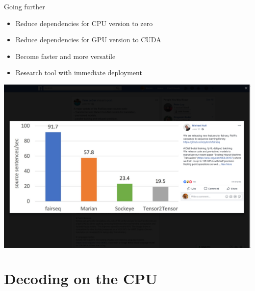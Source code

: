 \documentclass[aspectratio=169]{beamer}					%
\begin{document}
{

}


{

}


\begin{frame}{Going further}
\begin{itemize}
\item Reduce dependencies for CPU version to zero
\item Reduce dependencies for GPU version to CUDA
\item Become faster and more versatile
\item Research tool with immediate deployment
\end{itemize}
\end{frame}

{

}

\begin{frame}{}\centering
\includegraphics[height=\textheight]{fb}
\end{frame}

{

}



\part{Decoding on the CPU}
\frame{\partpage}
\end{document}
